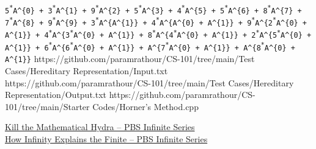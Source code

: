 \documentclass[../../Problems]{subfiles}
\begin{document}
\begin{testcasesFunctionMore}
{\texttt{5\textsuperscript{*}A\^{}\{0\} + 3\textsuperscript{*}A\^{}\{1\} + 9\textsuperscript{*}A\^{}\{2\} + 5\textsuperscript{*}A\^{}\{3\} + 4\textsuperscript{*}A\^{}\{5\} + 5\textsuperscript{*}A\^{}\{6\} + 8\textsuperscript{*}A\^{}\{7\} + 7\textsuperscript{*}A\^{}\{8\} + 9\textsuperscript{*}A\^{}\{9\} + 3\textsuperscript{*}A\^{}\{A\^{}\{1\}\} + 4\textsuperscript{*}A\^{}\{A\^{}\{0\} + A\^{}\{1\}\} + 9\textsuperscript{*}A\^{}\{2\textsuperscript{*}A\^{}\{0\} + A\^{}\{1\}\} + 4\textsuperscript{*}A\^{}\{3\textsuperscript{*}A\^{}\{0\} + A\^{}\{1\}\} + 8\textsuperscript{*}A\^{}\{4\textsuperscript{*}A\^{}\{0\} + A\^{}\{1\}\} + 2\textsuperscript{*}A\^{}\{5\textsuperscript{*}A\^{}\{0\} + A\^{}\{1\}\} + 6\textsuperscript{*}A\^{}\{6\textsuperscript{*}A\^{}\{0\} + A\^{}\{1\}\} + A\^{}\{7\textsuperscript{*}A\^{}\{0\} + A\^{}\{1\}\} + A\^{}\{8\textsuperscript{*}A\^{}\{0\} + A\^{}\{1\}\}}}
	{https://github.com/paramrathour/CS-101/tree/main/Test Cases/Hereditary Representation/Input.txt}
	{https://github.com/paramrathour/CS-101/tree/main/Test Cases/Hereditary Representation/Output.txt}
	{https://github.com/paramrathour/CS-101/tree/main/Starter Codes/Horner's Method.cpp}
\end{testcasesFunctionMore}
\begin{funvideo}
\href{https://youtu.be/uWwUpEY4c8o}{Kill the Mathematical Hydra -- PBS Infinite Series}\\
\href{https://youtu.be/oBOZ2WroiVY}{How Infinity Explains the Finite -- PBS Infinite Series}
\end{funvideo}
\recalctypearea
\end{document}
